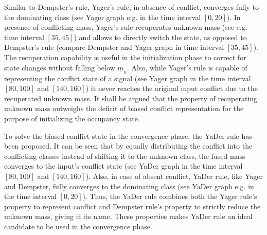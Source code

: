 Similar to Dempster's rule, Yager's rule, in absence of conflict, converges fully to the dominating class (see Yager graph e.g. in the time interval $[0, 20]$). In presence of conflicting mass, Yager's rule recuperates unknown mass (see e.g. time interval $[35, 45]$) and allows to directly switch the state, as opposed to Dempster's rule (compare Dempster and Yager graph in time interval $[35, 45]$). The recuperation capability is useful in the initialization phase to correct for state changes without falling below $\underline{m}_u$. Also, while Yager's rule is capable of representing the conflict state of a signal (see Yager graph in the time interval $[80, 100]$ and $[140, 160]$) it never reaches the original input conflict due to the recuperated unknown mass. It shall be argued that the property of recuperating unknown mass outweighs the deficit of biased conflict representation for the purpose of initializing the occupancy state.  

To solve the biased conflict state in the convergence phase, the YaDer rule has been proposed. It can be seen that by equally distributing the conflict into the conflicting classes instead of shifting it to the unknown class, the fused mass converges to the input's conflict state (see YaDer graph in the time interval $[80, 100]$ and $[140, 160]$). Also, in case of absent conflict, YaDer rule, like Yager and Dempster, fully converges to the dominating class (see YaDer graph e.g. in the time interval $[0,20]$). Thus, the YaDer rule combines both the Yager rule's property to represent conflict and Dempster rule's property to strictly reduce the unknown mass, giving it its name. These properties makes YaDer rule an ideal candidate to be used in the convergence phase.

